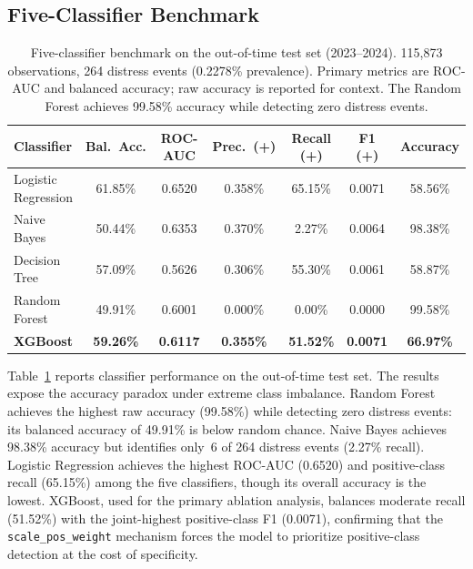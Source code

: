 \documentclass[sigconf,anonymous]{acmart}
\begin{document}
\subsection{Five-Classifier Benchmark}

\begin{table}[htbp]
\caption{Five-classifier benchmark on the out-of-time test set (2023--2024). 115,873 observations, 264 distress events (0.2278\% prevalence). Primary metrics are ROC-AUC and balanced accuracy; raw accuracy is reported for context. The Random Forest achieves 99.58\% accuracy while detecting zero distress events.}
\begin{center}
\begin{tabular}{lcccccc}
\toprule
\textbf{Classifier} & \textbf{Bal.\ Acc.} & \textbf{ROC-AUC} & \textbf{Prec.\ (+)} & \textbf{Recall (+)} & \textbf{F1 (+)} & \textbf{Accuracy} \\
\midrule
Logistic Regression & 61.85\% & 0.6520 & 0.358\% & 65.15\% & 0.0071 & 58.56\% \\
Naive Bayes & 50.44\% & 0.6353 & 0.370\% & 2.27\% & 0.0064 & 98.38\% \\
Decision Tree & 57.09\% & 0.5626 & 0.306\% & 55.30\% & 0.0061 & 58.87\% \\
Random Forest & 49.91\% & 0.6001 & 0.000\% & 0.00\% & 0.0000 & 99.58\% \\
\textbf{XGBoost} & \textbf{59.26\%} & \textbf{0.6117} & \textbf{0.355\%} & \textbf{51.52\%} & \textbf{0.0071} & \textbf{66.97\%} \\
\bottomrule
\end{tabular}
\label{tab_benchmark}
\end{center}
\end{table}

Table~\ref{tab_benchmark} reports classifier performance on the out-of-time test set. The results expose the accuracy paradox under extreme class imbalance. Random Forest achieves the highest raw accuracy (99.58\%) while detecting zero distress events: its balanced accuracy of 49.91\% is below random chance. Naive Bayes achieves 98.38\% accuracy but identifies only~6 of 264 distress events (2.27\% recall). Logistic Regression achieves the highest ROC-AUC (0.6520) and positive-class recall (65.15\%) among the five classifiers, though its overall accuracy is the lowest. XGBoost, used for the primary ablation analysis, balances moderate recall (51.52\%) with the joint-highest positive-class F1 (0.0071), confirming that the \texttt{scale\_pos\_weight} mechanism forces the model to prioritize positive-class detection at the cost of specificity.
\end{document}

